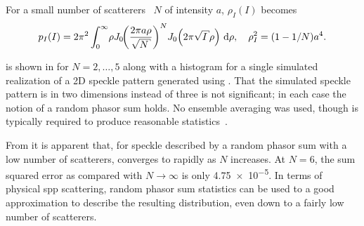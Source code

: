 For a small number of scatterers~\cite{jakeman1984speckle} $N$ of intensity
$a$, $\rho_I(I)$ becomes~\cite{goodman2007speckle}
\begin{equation}
  p_I(I) = 2\pi^2 \int_0^\infty\! \rho J_0\!{\left(\frac{2\pi a
    \rho}{\sqrt{N}}\right)}^N J_0\!\left(2\pi\sqrt{I}\rho\right)\md\rho,\quad \rho_I^2=(1-1/N)a^4.
  \label{eqn:smallscatteqn}
\end{equation}

 is shown in  for
$N=2,\ldots,5$ along with a histogram for a single simulated realization of a
2D speckle pattern generated using .  That the
simulated speckle pattern is in two dimensions instead of three is not
significant; in each case the notion of a random phasor sum holds.  No ensemble
averaging was used, though is typically required to produce reasonable
statistics~\cite{goodman2007speckle}.

From  it is apparent that, for speckle described by a
random phasor sum with a low number of scatterers,
 converges to  rapidly as $N$
increases.  At $N=6$, the sum squared error as compared with $N\to\infty$ is
only \num{4.75e-5}.  In terms of physical \gls{spp} scattering, random phasor sum
statistics can be used to a good approximation to describe the resulting
distribution, even down to a fairly low number of scatterers.

